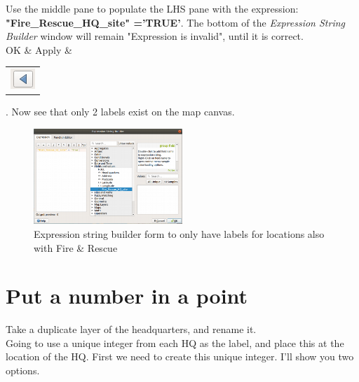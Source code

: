 Use the middle pane to populate the LHS pane with the expression: \textbf{"Fire\_Rescue\_HQ\_site" ='TRUE'}. The bottom of the \textit{Expression String Builder} window will remain "Expression is invalid", until it is correct.\\

OK \& Apply \& \begin{tabular}{@{}c@{}}\includegraphics[width=4ex]{images/blue_triangle_icon.png}\end{tabular}. Now see that only 2 labels exist on the map canvas.\\

\begin{figure}[!h]
	\centering
	\includegraphics[width=0.5\textwidth]{images/rule_based_labels2.png}
	\caption{Expression string builder form to only have labels for locations also with Fire \& Rescue}
	\label{ft_fig_firstfig3}
\end{figure}


\section{Put a number in a point}
Take a duplicate layer of the headquarters, and rename it.\\

Going to use a unique integer from each HQ as the label, and place this at the location of the HQ. First we need to create this unique integer. I'll show you two options.

